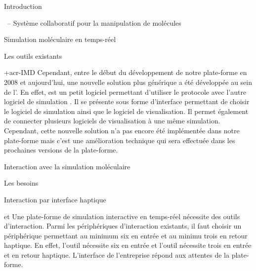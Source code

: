 \documentclass[myfrancais]{mythesis}
\begin{document}
\begin{mypart}{Introduction}
\begin{mychapter}{\myShaddock\ -- Système collaboratif pour la manipulation de molécules}
\begin{mysection}{Simulation moléculaire en temps-réel}
\begin{mysubsection}{Les outils existants}
\begin{mysubsubsection}{\myacronl+{acr-IMD}}
						Cependant, entre le début du développement de notre plate-forme en 2008 et aujourd'hui, une nouvelle solution plus générique a été développée au sein de l'.
						En effet, \myMDDriver {} est un petit logiciel permettant d'utiliser le protocole  avec l'autre logiciel de simulation \myGromacs.
						Il se présente sous forme d'interface permettant de choisir le logiciel de simulation ainsi que le logiciel de visualisation.
						Il permet également de connecter plusieurs logiciels de visualisation à une même simulation.
						Cependant, cette nouvelle solution n'a pas encore été implémentée dans notre plate-forme mais c'est une amélioration technique qui sera effectuée dans les prochaines versions de la plate-forme.
					\end{mysubsubsection}
				\end{mysubsection}
			\end{mysection}
			\begin{mysection}{Interaction avec la simulation moléculaire}
				\begin{mysubsection}{Les besoins}
				\end{mysubsection}
				\begin{mysubsection}{Interaction par interface haptique}
					\begin{mysubsubsection}{\myOmni et \myOpenHaptics}
						Une plate-forme de simulation interactive en temps-réel nécessite des outils d'interaction.
						Parmi les périphériques d'interaction existants, il faut choisir un périphérique permettant au minimum six  en entrée et au minimu trois  en retour haptique.
						En effet, l'outil  nécessite six  en entrée et l'outil  nécessite trois  en entrée et en retour haptique.
						L'interface \myOmni {} de l'entreprise \mySensAble répond aux attentes de la plate-forme.

						\begin{myfigure}
						\end{myfigure}


\end{mysubsubsection}
\end{mysubsection}
\end{mysection}
\end{mychapter}
\end{mypart}
\end{document}
